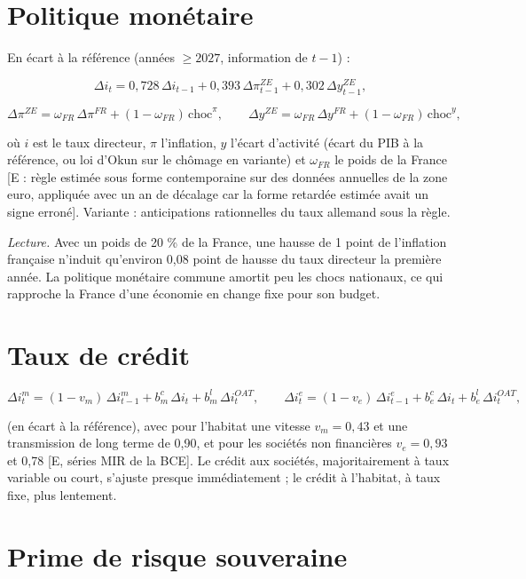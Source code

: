\documentclass[
  11pt,
  11pt,
  a4paper,
  openany]{book}
\begin{document}
\hypertarget{sec:eq-monetaire}{%
\section{Politique monétaire}\label{sec:eq-monetaire}}

En écart à la référence (années \(\ge 2027\), information de \(t-1\)) :

\[\Delta i_t = 0{,}728\,\Delta i_{t-1} + 0{,}393\,\Delta\pi^{ZE}_{t-1} + 0{,}302\,\Delta y^{ZE}_{t-1},\]

\[\Delta\pi^{ZE} = \omega_{FR}\,\Delta\pi^{FR} + (1-\omega_{FR})\,\text{choc}^\pi, \qquad \Delta y^{ZE} = \omega_{FR}\,\Delta y^{FR} + (1-\omega_{FR})\,\text{choc}^y,\]

où \(i\) est le taux directeur, \(\pi\) l'inflation, \(y\) l'écart
d'activité (écart du PIB à la référence, ou loi d'Okun sur le chômage en
variante) et \(\omega_{FR}\) le poids de la France {[}E : règle estimée
sous forme contemporaine sur des données annuelles de la zone euro,
appliquée avec un an de décalage car la forme retardée estimée avait un
signe erroné{]}. Variante : anticipations rationnelles du taux allemand
sous la règle.

\emph{Lecture.} Avec un poids de 20 \% de la France, une hausse de 1
point de l'inflation française n'induit qu'environ 0,08 point de hausse
du taux directeur la première année. La politique monétaire commune
amortit peu les chocs nationaux, ce qui rapproche la France d'une
économie en change fixe pour son budget.

\hypertarget{sec:eq-credit}{%
\section{Taux de crédit}\label{sec:eq-credit}}

\[\Delta i^{m}_t = (1 - v_m)\,\Delta i^m_{t-1} + b^c_m\,\Delta i_t + b^l_m\,\Delta i^{OAT}_t, \qquad
\Delta i^{e}_t = (1 - v_e)\,\Delta i^e_{t-1} + b^c_e\,\Delta i_t + b^l_e\,\Delta i^{OAT}_t,\]

(en écart à la référence), avec pour l'habitat une vitesse
\(v_m = 0{,}43\) et une transmission de long terme de 0,90, et pour les
sociétés non financières \(v_e = 0{,}93\) et 0,78 {[}E, séries MIR de la
BCE{]}. Le crédit aux sociétés, majoritairement à taux variable ou
court, s'ajuste presque immédiatement ; le crédit à l'habitat, à taux
fixe, plus lentement.

\hypertarget{sec:eq-prime}{%
\section{Prime de risque souveraine}\label{sec:eq-prime}}
\end{document}
